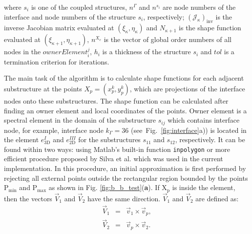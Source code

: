 %
%
%
where \(s_i\) is one of the coupled structures, \(n^{\Gamma}\) and \(n^{s_i}\) are node numbers of the interface and node numbers of the structure \(s_i\), respectively; \(\left(\mathcal{J}_{\kappa}\right)_{\mathrm{inv}}\) is the inverse Jacobian matrix evaluated at \((\xi_{\kappa},\eta_{\kappa})\) and \(N_{\kappa+1}\) is the shape function evaluated at \((\xi_{\kappa+1},\eta_{\kappa+1})\), \(n^{X_e}\) is the vector of global order numbers of all nodes in the \(ownerElement^j_i\), \(h_i\) is a thickness of the structure \(s_i\) and \(tol\) is a termination criterion for iterations.

The main task of the algorithm is to calculate shape functions for each adjacent substructure at the points \(X_p=(x_p^k,y_p^k)\), which are projections of the interface nodes onto these substructures.
The shape function can be calculated after finding an owner element and local coordinates of the points.
Owner element is a spectral element in the domain of the substructure \(s_{ij}\) which contains interface node, for example, interface node \(k_\Gamma=36\) (see~Fig.~\ref{fig:interface}a)) is located in the element \(e^{I}_{3\mathrm{D}}\) and \(e^{III}_{2\mathrm{D}}\) for the substructures \(s_{11}\) and \(s_{12}\), respectively.
It can be found within two ways: using Matlab's built-in function \verb+inpolygon+ or more efficient procedure proposed by Silva et al. \cite{silva2009exact} which was used in the current implementation.
In this procedure, an initial approximation is first performed by rejecting all external points outside the rectangular region bounded by the points \(\mathrm{P_{min}}\) and \(\mathrm{P_{max}}\) as shown in Fig. \ref{fig:b_b_test}(\textbf{a}).
If \(\mathrm{X_p}\) is inside the element, then the vectors \(\vec{V}_1\) and \(\vec{V}_2\) have the same direction.
\(\vec{V}_1\) and \(\vec{V}_2\) are defined as:
\begin{eqnarray}
	\vec{V}_1 & = & \vec{v}_1\times \vec{v}_p,\\
	\vec{V}_2 & = & \vec{v}_p\times \vec{v}_2.
\label{eq:v_vectors}
\end{eqnarray}
%
%
%

